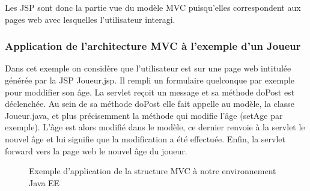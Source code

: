 Les JSP sont donc la partie vue du modèle MVC puisqu'elles correspondent aux pages web avec lesquelles l'utilisateur interagi.

\subsubsection{Application de l'architecture MVC à l'exemple d'un Joueur}
Dans cet exemple on considère que l'utilisateur est sur une page web intitulée générée par la JSP Joueur.jsp. Il rempli un formulaire quelconque par exemple pour moddifier son âge. La servlet reçoit un message et sa méthode doPost est déclenchée. Au sein de sa méthode doPost elle fait appelle au modèle, la classe Joueur.java, et plus précisemment la méthode qui modifie l'âge (setAge par exemple). L'âge est alors modifié dans le modèle, ce dernier renvoie à la servlet le nouvel âge et lui signifie que la modification a été effectuée. Enfin, la servlet forward vers la page web le nouvel âge du joueur.
\begin{figure}[H]
  \center
  \caption{Exemple d'application de la structure MVC à notre environnement Java EE}
\end{figure}
